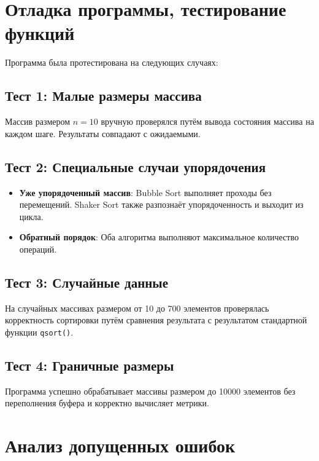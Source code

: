 \documentclass[a4paper,12pt,titlepage]{article}
\begin{document}
\newpage

\section{Отладка программы, тестирование функций}

Программа была протестирована на следующих случаях:

\subsection{Тест 1: Малые размеры массива}

Массив размером $n=10$ вручную проверялся путём вывода состояния массива на каждом шаге. Результаты совпадают с ожидаемыми.

\subsection{Тест 2: Специальные случаи упорядочения}

\begin{itemize}
    \item \textbf{Уже упорядоченный массив}: Bubble Sort выполняет проходы без перемещений. Shaker Sort также разпознаёт упорядоченность и выходит из цикла.
    \item \textbf{Обратный порядок}: Оба алгоритма выполняют максимальное количество операций.
\end{itemize}

\subsection{Тест 3: Случайные данные}

На случайных массивах размером от 10 до 700 элементов проверялась корректность сортировки путём сравнения результата с результатом стандартной функции \texttt{qsort()}.

\subsection{Тест 4: Граничные размеры}

Программа успешно обрабатывает массивы размером до 10000 элементов без переполнения буфера и корректно вычисляет метрики.

\newpage

\section{Анализ допущенных ошибок}
\end{document}
